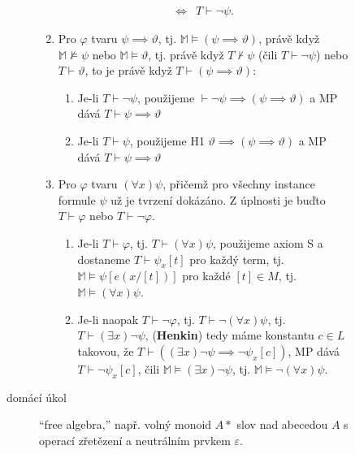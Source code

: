 \documentclass[a4paper]{article}
\begin{document}
\begin{description}
\begin{description}
\begin{description}
\begin{enumerate}
\begin{align*}
										\iff& T \vdash \neg \psi
									.\end{align*}
								\item Pro $\varphi$ tvaru $\psi \implies \vartheta$, tj.
									$\mathbb{M} \models (\psi \implies \vartheta)$, právě když
									$\mathbb{M} \not \models \psi$ nebo $\mathbb{M} \models \vartheta$,
									tj. právě když $T \not \vdash \psi$ (čili $T \vdash \neg \psi$)
									nebo $T \vdash \vartheta$, to je právě když
									$T \vdash (\psi \implies \vartheta)$:
									\begin{enumerate}
										\item Je-li $T \vdash \neg \psi$, použijeme
											$\vdash \neg \psi \implies (\psi \implies \vartheta)$ a MP
											dává $T \vdash \psi \implies \vartheta$
										\item Je-li $T \vdash \psi$, použijeme H1
											$\vartheta \implies (\psi \implies \vartheta)$ a MP
											dává $T \vdash \psi \implies \vartheta$
									\end{enumerate}
								\item Pro $\varphi$ tvaru $(\forall x) \psi$, přičemž pro všechny
									instance formule  $\psi$ už je tvrzení dokázáno.
									Z úplnosti je buďto $T \vdash \varphi$ nebo $T \vdash \neg \varphi$.
									\begin{enumerate}
										\item Je-li $T \vdash \varphi$, tj. $T \vdash (\forall x) \psi$,
										použijeme axiom S a dostaneme $T \vdash \psi_x[t]$ pro každý term,
										tj. $\mathbb{M} \models \psi[e(x/[t])]$ pro každé $[t] \in M$,
										tj. $\mathbb{M} \models (\forall x) \psi$.
										\item Je-li naopak $T \vdash \neg \varphi$, tj.
											$T \vdash \neg (\forall x) \psi$, tj.
											$T \vdash (\exists x) \neg \psi$, (\textbf{Henkin}) tedy
											máme konstantu $c \in L$ takovou, že
											$T \vdash ((\exists x) \neg \psi \implies \neg \psi_x[c])$,
											MP dává $T \vdash \neg \psi_x[c]$, čili
											$\mathbb{M} \models (\exists x) \neg \psi$, tj.
											$\mathbb{M} \models \neg (\forall x) \psi$.
									\end{enumerate}
							\end{enumerate}
						\item[domácí úkol] \enquote{free algebra,} např. volný monoid $A*$ slov
							nad abecedou $A$ s operací zřetězení a neutrálním prvkem $\varepsilon$.
					\end{description}
			\end{description}
	\end{description}
\end{document}
